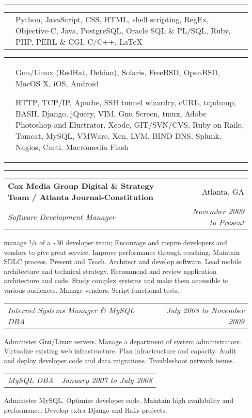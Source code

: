 \documentclass[10pt]{article}
\makeatletter
\newcounter{blocktitlechildren}
\newcommand{\blocktitle}[1]{
    \blocktitlechild{2mm}
    \setcounter{blocktitlechildren}{0}
    {{\sc{#1}\vspace{1.5mm}\hrule}\vspace*{1.5mm}}
}
\newcommand{\blocktitlechild}[2][]{
    \ifthenelse{\equal{\value{blocktitlechildren}}{0}}{}{\vspace{#2}#1}
    \addtocounter{blocktitlechildren}{1}
}
\newcommand{\skillnew}[2]{
    \blocktitlechild{1mm}
    \begin{tabular}
        {p{2cm}p{16cm}}
        \noindent\raggedright{\skillfont{#1}} & #2
    \end{tabular}
}
\newcommand{\sectionheader}[4]{
    \blocktitlechild{2mm}
    \begin{tabular*}{\textwidth}{l@{\extracolsep{\fill}}r}
    \textbf{#1} & #2\\
    \emph{#3} & \emph{#4}
    \end{tabular*}
}
\newcommand{\sectionsub}[2]{
    \blocktitlechild{1.4mm}
    \begin{tabular*}{\textwidth}{l@{\extracolsep{\fill}}r}
    \emph{#1} & \emph{#2}
    \end{tabular*}
}
\newenvironment{longtext}[1]{\small {#1}}
\makeatother
\begin{document}
\blocktitle{Skills}

\skillnew{Languages}{
    Python,
    JavaScript,
    CSS,
    HTML,
    shell scripting,
    RegEx,
    Objective-C,
    Java,
    PostgreSQL,
    Oracle SQL \& PL/SQL,
    Ruby,
    PHP,
    PERL \& CGI,
    C/C++,
    \LaTeX
}

\skillnew{Systems \& Software}{
    Gnu/Linux (RedHat, Debian),
    Solaris,
    FreeBSD,
    OpenBSD,
    MacOS X,
    iOS,
    Android

    HTTP,
    TCP/IP,
    Apache,
    SSH tunnel wizardry,
    cURL,
    tcpdump,
    BASH,
    Django,
    jQuery,
    VIM,
    Gnu Screen,
    tmux,
    Adobe Photoshop and Illustrator,
    Xcode,
    GIT/SVN/CVS,
    Ruby on Rails,
    Tomcat,
    MySQL,
    VMWare,
    Xen,
    LVM,
    BIND DNS,
    Splunk,
    Nagios,
    Cacti,
    Macromedia Flash
}

\blocktitle{Experience}

\sectionheader
{Cox Media Group Digital \& Strategy Team / Atlanta Journal-Constitution}
{Atlanta, GA}
{Software Development Manager}
{November 2009 to Present}
\begin{longtext}
manage $\sfrac{1}{4}$ of a \~{}30 developer team;
Encourage and inspire developers and vendors to give great service.
Improve performance through coaching.
Maintain SDLC process.
Present and Teach.
Architect and develop software.
Lead mobile architecture and technical strategy.
Recommend and review application architecture and code.
Study complex systems and make them accessible to various audiences.
Manage vendors.
Script functional tests.

\end{longtext}
\sectionsub
{Internet Systems Manager \& MySQL DBA}
{July 2008 to November 2009}
\begin{longtext}
Administer Gnu/Linux servers.
Manage a department of system administrators.
Virtualize existing web infrastructure.
Plan infrastructure and capacity.
Audit and deploy developer code and data migrations.
Troubleshoot network issues.
\end{longtext}
\sectionsub
{MySQL DBA}
{January 2007 to July 2008}
\begin{longtext}
Administer MySQL.
Optimize developer code.
Maintain high availability and performance.
Develop extra Django and Rails projects.
\end{longtext}
\end{document}
